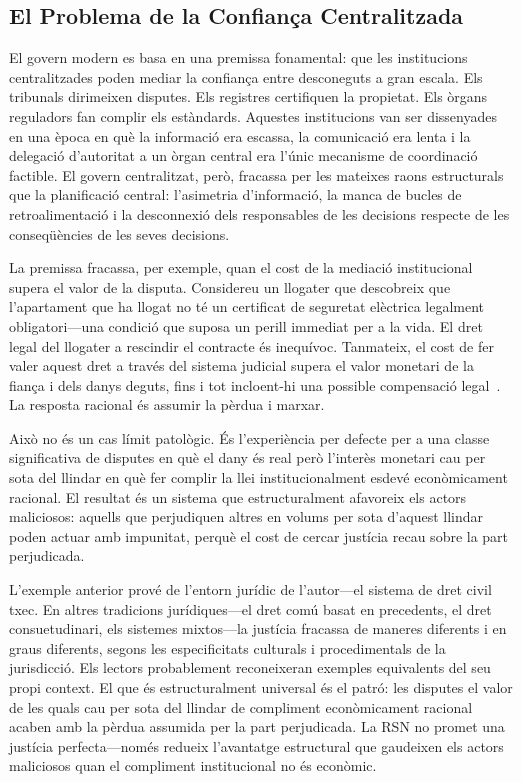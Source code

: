 \documentclass[11pt,a4paper,twocolumn]{article}
\begin{document}
\subsection{El Problema de la Confiança Centralitzada}

El govern modern es basa en una premissa fonamental: que les institucions centralitzades poden mediar la confiança entre desconeguts a gran escala. Els tribunals dirimeixen disputes. Els registres certifiquen la propietat. Els òrgans reguladors fan complir els estàndards. Aquestes institucions van ser dissenyades en una època en què la informació era escassa, la comunicació era lenta i la delegació d'autoritat a un òrgan central era l'únic mecanisme de coordinació factible. El govern centralitzat, però, fracassa per les mateixes raons estructurals que la planificació central: l'asimetria d'informació, la manca de bucles de retroalimentació i la desconnexió dels responsables de les decisions respecte de les conseqüències de les seves decisions.

La premissa fracassa, per exemple, quan el cost de la mediació institucional supera el valor de la disputa. Considereu un llogater que descobreix que l'apartament que ha llogat no té un certificat de seguretat elèctrica legalment obligatori---una condició que suposa un perill immediat per a la vida. El dret legal del llogater a rescindir el contracte és inequívoc. Tanmateix, el cost de fer valer aquest dret a través del sistema judicial supera el valor monetari de la fiança i dels danys deguts, fins i tot incloent-hi una possible compensació legal~\cite{czcourtfees}. La resposta racional és assumir la pèrdua i marxar.

Això no és un cas límit patològic. És l'experiència per defecte per a una classe significativa de disputes en què el dany és real però l'interès monetari cau per sota del llindar en què fer complir la llei institucionalment esdevé econòmicament racional. El resultat és un sistema que estructuralment afavoreix els actors maliciosos: aquells que perjudiquen altres en volums per sota d'aquest llindar poden actuar amb impunitat, perquè el cost de cercar justícia recau sobre la part perjudicada.

L'exemple anterior prové de l'entorn jurídic de l'autor---el sistema de dret civil txec. En altres tradicions jurídiques---el dret comú basat en precedents, el dret consuetudinari, els sistemes mixtos---la justícia fracassa de maneres diferents i en graus diferents, segons les especificitats culturals i procedimentals de la jurisdicció. Els lectors probablement reconeixeran exemples equivalents del seu propi context. El que és estructuralment universal és el patró: les disputes el valor de les quals cau per sota del llindar de compliment econòmicament racional acaben amb la pèrdua assumida per la part perjudicada. La RSN no promet una justícia perfecta---només redueix l'avantatge estructural que gaudeixen els actors maliciosos quan el compliment institucional no és econòmic.
\end{document}
